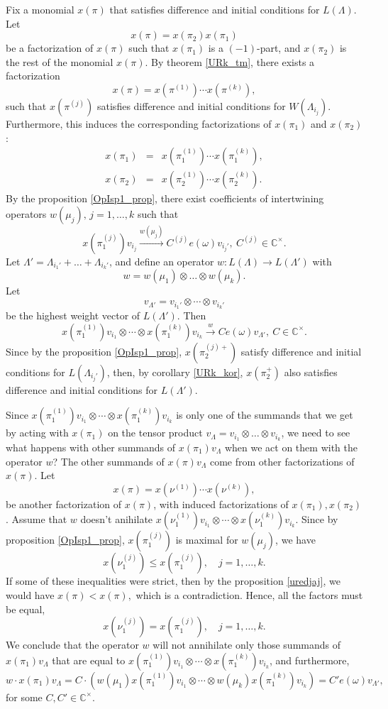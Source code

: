 \documentclass[a4paper, 10pt,oneside]{amsart}
\begin{document}
Fix a monomial $x(\pi)$ that satisfies difference and initial conditions for $L(\Lambda)$. Let
$$x(\pi)=x(\pi_2) x(\pi_1)$$
be a factorization of $x(\pi)$ such that $x(\pi_1)$ is a $(-1)$-part, and $x(\pi_2)$ is the rest of the monomial $x(\pi)$. By theorem
\ref{URk_tm}, there exists a factorization
 $$x(\pi)=x(\pi^{(1)})\cdots x(\pi^{(k)}),$$
such that $x(\pi^{(j)})$ satisfies difference and initial conditions for $W(\Lambda_{i_j})$. Furthermore, this induces the corresponding
factorizations of $x(\pi_1)$ and $x(\pi_2)$:
\begin{eqnarray*}x(\pi_1) & = & x(\pi_1^{(1)})\cdots x(\pi_1^{(k)}),\\
x(\pi_2) & = & x(\pi_2^{(1)})\cdots x(\pi_2^{(k)}).
\end{eqnarray*}
By the proposition \ref{OpIsp1_prop}, there exist coefficients of intertwining operators $w(\mu_j),\,j=1,\dots,k$ such that
$$x(\pi_1^{(j)})v_{i_j} \xrightarrow{w(\mu_j)} C^{(j)} e(\omega) v_{i_j'},\
C^{(j)}\in{{\mathbb C}}^{\times}.$$ Let $\Lambda'=\Lambda_{i_1'}+\dots+\Lambda_{i_k'}$, and define an operator $w:L(\Lambda)\to L(\Lambda')$ with
$$w=w(\mu_1)\otimes\dots\otimes w(\mu_k).$$
Let
$$v_{\Lambda'}=v_{i_1'}\otimes\cdots\otimes v_{i_k'}$$
be the highest weight vector of $L(\Lambda')$. Then
$$x(\pi_1^{(1)})v_{i_1}\otimes\cdots\otimes x(\pi_1^{(k)})v_{i_k} \stackrel{w}{\longrightarrow} C e(\omega) v_{\Lambda'},\
C\in{{\mathbb C}}^{\times}.$$ Since by the proposition \ref{OpIsp1_prop}, $x(\pi_2^{(j)+})$ satisfy difference and initial conditions for
$L(\Lambda_{i_j'})$, then, by corollary \ref{URk_kor}, $x(\pi_2^+)$ also satisfies difference and initial conditions for $L(\Lambda')$.

Since  $x(\pi_1^{(1)})v_{i_1}\otimes\cdots\otimes
x(\pi_1^{(k)})v_{i_k}$ is only one of the summands that we get by acting
with $x(\pi_1)$ on the tensor product
$v_\Lambda=v_{i_1}\otimes\dots\otimes v_{i_k}$, we need to see what happens with other summands of $x(\pi_1)v_\Lambda$ when we
act on them with the operator $w$?
The other summands of
$x(\pi)v_\Lambda$ come from other factorizations of $x(\pi)$.
Let
$$x(\pi)=x(\nu^{(1)})\cdots x(\nu^{(k)}),$$
be another factorization of $x(\pi)$, with induced
factorizations of $x(\pi_1),x(\pi_2)$. Assume that $w$ doesn't
anihilate $x(\nu_1^{(1)})v_{i_1}\otimes\cdots\otimes
x(\nu_1^{(k)})v_{i_k}$. Since by proposition \ref{OpIsp1_prop},  $x(\pi_1^{(j)})$ is maximal for $w(\mu_j)$, we have
$$x(\nu_1^{(j)})\leq x(\pi_1^{(j)}),\quad j=1,\dots,k.$$
If some of these inequalities were strict, then by the proposition
\ref{uredjaj}, we would have $x(\pi)<x(\pi),$ which is a contradiction.
Hence, all the factors must be equal,
$$x(\nu_1^{(j)})= x(\pi_1^{(j)}),\quad j=1,\dots,k.$$
We conclude that the operator $w$ will not annihilate only those summands of
$x(\pi_1)v_\Lambda$ that are equal to
$x(\pi_1^{(1)})v_{i_1}\otimes\cdots\otimes x(\pi_1^{(k)})v_{i_k}$,
and furthermore,
$$w\cdot x(\pi_1)v_\Lambda=C\cdot( w(\mu_1)x(\pi_1^{(1)})v_{i_1}\otimes\cdots\otimes w(\mu_k)x(\pi_1^{(k)})v_{i_k}) = C' e(\omega) v_{\Lambda'},$$
for some $C,C'\in{{\mathbb C}}^{\times}.$
\end{document}
